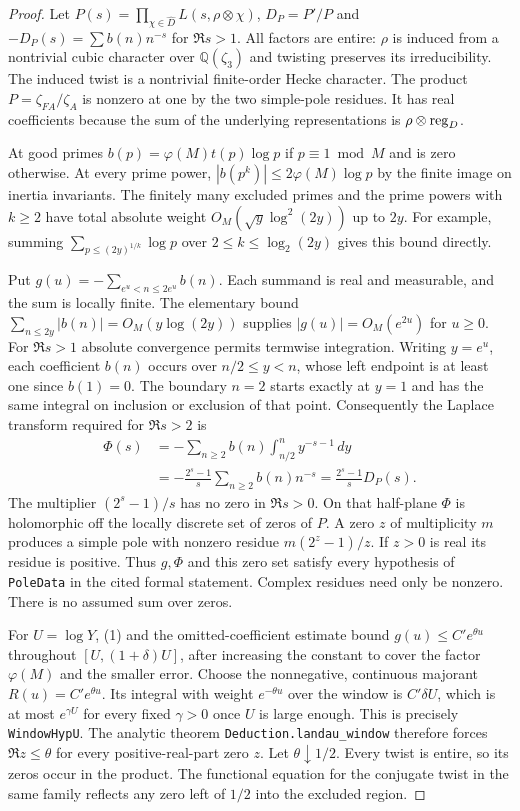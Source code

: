 \documentclass[11pt]{article}
\begin{document}
\begin{proof}
Let $P(s)=\prod_{\chi\in\widehat D}L(s,\rho\otimes\chi)$,
$D_P=P'/P$ and $-D_P(s)=\sum b(n)n^{-s}$ for $\Re s>1$.
All factors are entire: $\rho$ is induced from a nontrivial cubic
character over $\mathbb Q(\zeta_3)$ and twisting preserves its
irreducibility. The induced twist is a nontrivial finite-order Hecke
character. The product $P=\zeta_{FA}/\zeta_A$ is nonzero at one by
the two simple-pole residues. It has real coefficients because the
sum of the underlying representations is $\rho\otimes{\rm reg}_D$.

At good primes $b(p)=\varphi(M)t(p)\log p$ if $p\equiv1\bmod M$
and is zero otherwise. At every prime power,
$|b(p^k)|\le2\varphi(M)\log p$ by the finite image on inertia
invariants. The finitely many excluded primes and the prime powers
with $k\ge2$ have total absolute weight
$O_M(\sqrt y\log^2(2y))$ up to $2y$. For example, summing
$\sum_{p\le(2y)^{1/k}}\log p$ over $2\le k\le\log_2(2y)$ gives this
bound directly.

Put $g(u)=-\sum_{e^u<n\le2e^u}b(n)$. Each summand is real and
measurable, and the sum is locally finite. The elementary bound
$\sum_{n\le2y}|b(n)|=O_M(y\log(2y))$ supplies
$|g(u)|=O_M(e^{2u})$ for $u\ge0$. For $\Re s>1$ absolute convergence
permits termwise integration. Writing $y=e^u$, each coefficient
$b(n)$ occurs over $n/2\le y<n$, whose left endpoint is at least
one since $b(1)=0$. The boundary $n=2$ starts exactly at $y=1$
and has the same integral on inclusion or exclusion of that point.
Consequently the Laplace transform required for $\Re s>2$ is
\[
\begin{aligned}
\Phi(s)
 &= -\sum_{n\ge2} b(n)\int_{n/2}^n y^{-s-1}\,dy\\
 &= -\frac{2^s-1}{s}\sum_{n\ge2} b(n)n^{-s}
  =\frac{2^s-1}{s}D_P(s).
\end{aligned}
\tag{2}
\]
The multiplier $(2^s-1)/s$ has no zero in $\Re s>0$. On that half-plane
$\Phi$ is holomorphic off the locally discrete set of zeros of $P$.
A zero $z$ of multiplicity $m$ produces a simple pole with nonzero
residue $m(2^z-1)/z$. If $z>0$ is real its residue is positive.
Thus $g,\Phi$ and this zero set satisfy every hypothesis of
\texttt{PoleData} in the cited formal statement. Complex residues
need only be nonzero. There is no assumed sum over zeros.

For $U=\log Y$, (1) and the omitted-coefficient estimate bound
$g(u)\le C'e^{\theta u}$ throughout $[U,(1+\delta)U]$, after increasing
the constant to cover the factor $\varphi(M)$ and the smaller error.
Choose the nonnegative, continuous majorant $R(u)=C'e^{\theta u}$.
Its integral with weight $e^{-\theta u}$ over the window is $C'\delta U$,
which is at most $e^{\gamma U}$ for every fixed $\gamma>0$ once $U$
is large enough. This is precisely \texttt{WindowHypU}. The analytic
theorem \texttt{Deduction.landau\_window} therefore forces
$\Re z\le\theta$ for every positive-real-part zero $z$.
Let $\theta\downarrow1/2$. Every twist is entire, so its zeros occur
in the product. The functional equation for the conjugate twist in the
same family reflects any zero left of $1/2$ into the excluded region.


\end{proof}
\end{document}
